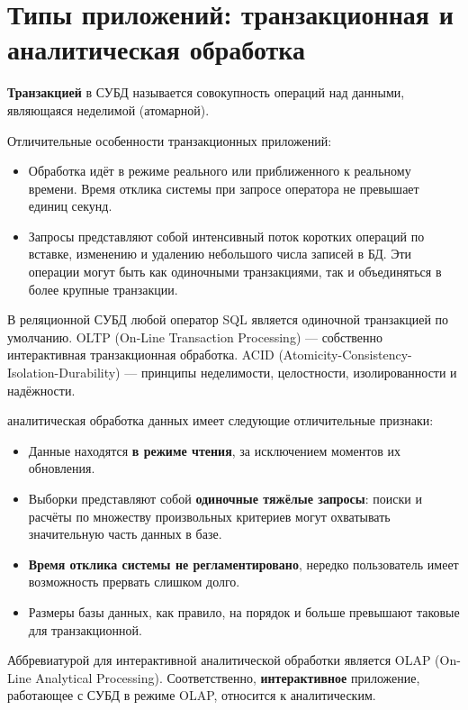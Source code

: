 \documentclass{beamer}
\begin{document}
\section{Типы приложений: транзакционная и аналитическая обработка}
\begin{frame}
\textbf{Транзакцией} в СУБД называется совокупность операций над данными, являющаяся неделимой (атомарной).

Отличительные особенности транзакционных приложений:
\begin{itemize}
\item Обработка идёт в режиме реального или приближенного к реальному времени. Время отклика системы при запросе оператора не превышает единиц секунд.
\item Запросы представляют собой интенсивный поток коротких операций по вставке, изменению и удалению небольшого числа записей в БД. Эти операции могут быть как одиночными транзакциями, так и объединяться в более крупные транзакции.
\end{itemize}
В реляционной СУБД любой оператор SQL является одиночной транзакцией по умолчанию.
OLTP (On-Line Transaction Processing) — собственно интерактивная транзакционная обработка.
ACID (Atomicity-Consistency-Isolation-Durability) — принципы неделимости, целостности,
изолированности и надёжности.
\end{frame}

\begin{frame}
аналитическая обработка данных имеет следующие отличительные признаки:
\begin{itemize}
\item Данные находятся \textbf{в режиме чтения}, за исключением моментов их обновления.
\item Выборки представляют собой \textbf{одиночные тяжёлые запросы}: поиски и расчёты по множеству произвольных критериев могут охватывать значительную часть данных в базе.
\item \textbf{Время отклика системы не регламентировано}, нередко пользователь имеет возможность прервать слишком долго.
\item Размеры базы данных, как правило, на порядок и больше превышают таковые для транзакционной.
\end{itemize}
Аббревиатурой для интерактивной аналитической обработки является OLAP (On-Line Analytical Processing). Соответственно, \textbf{интерактивное} приложение, работающее с СУБД в режиме OLAP, относится к аналитическим.
\end{frame}
\end{document}
